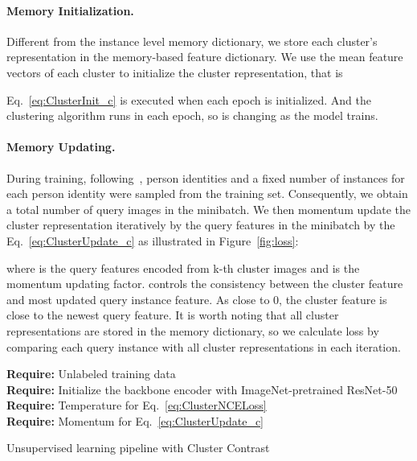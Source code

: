 \paragraph{Memory Initialization.}
Different from the instance level memory dictionary, we store each cluster's representation  in the memory-based feature dictionary. 
We use the mean feature vectors of each cluster to initialize the cluster representation, that is

Eq.~\ref{eq:ClusterInit_c} is executed when each epoch is initialized. And the clustering algorithm runs in each epoch, so  is changing as the model trains.

\paragraph{Memory Updating.}

During training, following~\cite{hermans2017defense},  person identities and a fixed number  of instances for each person identity were sampled from the training set.
Consequently, we obtain a total number of  query images in the minibatch.
We then momentum update the cluster representation iteratively by the query features in the minibatch by the Eq.~\ref{eq:ClusterUpdate_c} as illustrated in Figure~\ref{fig:loss}:

where  is the query features encoded from k-th cluster images and  is the momentum updating factor.  controls the consistency between the cluster feature and most updated query instance feature. As  close to 0, the cluster feature  is close to the newest query feature. It is worth noting that all cluster representations are stored in the memory dictionary, so we calculate loss by comparing each query instance with all cluster representations in each iteration.






\begin{algorithm}[!t]
    \textbf{Require:} Unlabeled training data \\
    \textbf{Require:} Initialize the backbone encoder  with ImageNet-pretrained ResNet-50 \\
    \textbf{Require:} Temperature  for Eq.~\ref{eq:ClusterNCELoss} \\
    \textbf{Require:} Momentum  for Eq.~\ref{eq:ClusterUpdate_c} \\
    \caption{Unsupervised learning pipeline with Cluster Contrast}
    \label{algorithm}
\end{algorithm}



